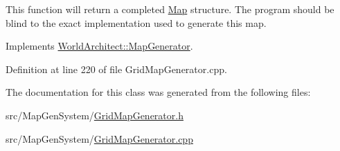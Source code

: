 This function will return a completed \mbox{\hyperlink{class_world_architect_1_1_map}{Map}} structure. The program should be blind to the exact implementation used to generate this map. 

Implements \mbox{\hyperlink{class_world_architect_1_1_map_generator_a0b9c37985de91e45501f69785a9dde8f}{World\+Architect\+::\+Map\+Generator}}.



Definition at line 220 of file Grid\+Map\+Generator.\+cpp.



The documentation for this class was generated from the following files\+:\begin{DoxyCompactItemize}
\item 
src/\+Map\+Gen\+System/\mbox{\hyperlink{_grid_map_generator_8h}{Grid\+Map\+Generator.\+h}}\item 
src/\+Map\+Gen\+System/\mbox{\hyperlink{_grid_map_generator_8cpp}{Grid\+Map\+Generator.\+cpp}}\end{DoxyCompactItemize}

